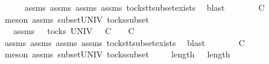 \begin{isabellebody}
\ \ \ \ \isamarkupfalse%
\ assms{\isacharparenleft}{}{\isacharparenright}\ assms{\isacharparenleft}{}{\isacharparenright}\ assms{\isacharparenleft}{}{\isacharparenright}\ assms{\isacharparenleft}{}{\isacharparenright}\ tocks{\isacharunderscore}tt{\isacharunderscore}subset{\isacharunderscore}exists\ \isamarkupfalse%
\ blast\isanewline
\ \ \isamarkupfalse%
\ \isamarkupfalse%
\ {}{\isacharcolon}\ {\isachardoublequoteopen}{\isasymrho}{\isacharprime}{\isacharprime}\ {\isasymle}\isactrlsub C\ {\isasymrho}{\isacharprime}{\isachardoublequoteclose}\isanewline
\ \ \ \ \isamarkupfalse%
\ {\isacharparenleft}meson\ assms{\isacharparenleft}{}{\isacharparenright}\ subset{\isacharunderscore}UNIV\ tocks{\isacharunderscore}subset{\isacharparenright}\isanewline
\ \ \isamarkupfalse%
\ {\isasymrho}{\isacharprime}{\isacharprime}{\isacharprime}\ \ {\isasymrho}{\isacharprime}{\isacharprime}{\isacharprime}{\isacharunderscore}assms{\isacharcolon}\ {\isachardoublequoteopen}{\isasymrho}{\isacharprime}{\isacharprime}{\isacharprime}\ {\isasymin}\ tocks\ UNIV\ {\isasymand}\ {\isasymrho}{\isacharprime}\ {\isasymsubseteq}\isactrlsub C\ {\isasymrho}{\isacharprime}{\isacharprime}{\isacharprime}\ {\isasymand}\ {\isasymrho}{\isacharprime}{\isacharprime}{\isacharprime}\ {\isasymle}\isactrlsub C\ {\isasymrho}\ {\isacharat}\ {\isasymsigma}{\isachardoublequoteclose}\isanewline
\ \ \ \ \isamarkupfalse%
\ assms{\isacharparenleft}{}{\isacharparenright}\ assms{\isacharparenleft}{}{\isacharparenright}\ assms{\isacharparenleft}{}{\isacharparenright}\ assms{\isacharparenleft}{}{\isacharparenright}\ tocks{\isacharunderscore}tt{\isacharunderscore}subset{\isacharunderscore}exists{}\ \isamarkupfalse%
\ blast\isanewline
\ \ \isamarkupfalse%
\ \isamarkupfalse%
\ {}{\isacharcolon}\ {\isachardoublequoteopen}{\isasymrho}{\isacharprime}{\isacharprime}{\isacharprime}\ {\isasymle}\isactrlsub C\ {\isasymrho}{\isachardoublequoteclose}\isanewline
\ \ \ \ \isamarkupfalse%
\ {\isacharparenleft}meson\ assms{\isacharparenleft}{}{\isacharparenright}\ subset{\isacharunderscore}UNIV\ tocks{\isacharunderscore}subset{\isacharparenright}\isanewline
\ \ \isamarkupfalse%
\ {}{\isacharcolon}\ {\isachardoublequoteopen}length\ {\isasymrho}{\isacharprime}\ {\isacharequal}\ length\ {\isasymrho}{\isacharprime}{\isacharprime}{\isacharprime}{\isachardoublequoteclose}\isanewline

\end{isabellebody}
